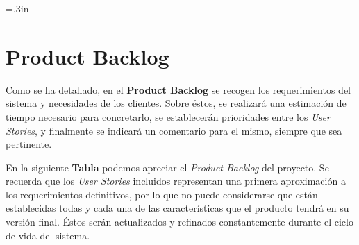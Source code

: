 \documentclass[a4paper,12pt]{article}
\begin{document}
	\headheight=.3in
	\renewcommand{\headrulewidth}{0.5pt} %
	\lhead[]{}
	\chead[]{}
	\rhead[]{}
	\cfoot[]{}
	\rfoot[\thepage]{\thepage}%
	\renewcommand{\footrulewidth}{0.5pt}



\tableofcontents

\newpage


\section{Product Backlog}

Como se ha detallado, en el \textbf{Product Backlog} se recogen los requerimientos del sistema y necesidades de los clientes.
Sobre éstos, se realizará una estimación de tiempo necesario para concretarlo, se establecerán prioridades entre los \textit{User Stories}, y finalmente se indicará un comentario para el mismo, siempre que sea pertinente.

En la siguiente \textbf{Tabla} podemos apreciar el \textit{Product Backlog} del proyecto.
Se recuerda que los \textit{User Stories} incluidos representan una primera aproximación a los requerimientos definitivos, por lo que no puede considerarse que están establecidas todas y cada una de las características que el producto tendrá en su versión final.
Éstos serán actualizados y refinados constantemente durante el ciclo de vida del sistema.
\end{document}
